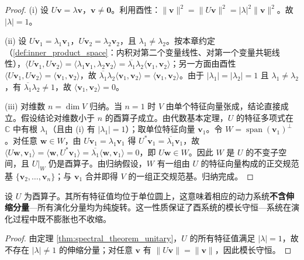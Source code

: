 \begin{proof}
(i) 设 $U\mathbf{v} = \lambda \mathbf{v}$，$\mathbf{v} \neq \mathbf{0}$。利用酉性：$\|\mathbf{v}\|^2 = \|U\mathbf{v}\|^2 = |\lambda|^2 \|\mathbf{v}\|^2$。故 $|\lambda| = 1$。

(ii) 设 $U\mathbf{v}_1 = \lambda_1 \mathbf{v}_1$，$U\mathbf{v}_2 = \lambda_2 \mathbf{v}_2$，且 $\lambda_1 \neq \lambda_2$。按本章约定（\cref{def:inner_product_space}：内积对第二个变量线性、对第一个变量共轭线性），$\langle U\mathbf{v}_1, U\mathbf{v}_2 \rangle = \langle \lambda_1 \mathbf{v}_1, \lambda_2 \mathbf{v}_2 \rangle = \overline{\lambda_1} \lambda_2 \langle \mathbf{v}_1, \mathbf{v}_2 \rangle$；另一方面由酉性 $\langle U\mathbf{v}_1, U\mathbf{v}_2 \rangle = \langle \mathbf{v}_1, \mathbf{v}_2 \rangle$，故 $\overline{\lambda_1} \lambda_2 \langle \mathbf{v}_1, \mathbf{v}_2 \rangle = \langle \mathbf{v}_1, \mathbf{v}_2 \rangle$。由于 $|\lambda_1| = |\lambda_2| = 1$ 且 $\lambda_1 \neq \lambda_2$，有 $\overline{\lambda_1} \lambda_2 \neq 1$，故 $\langle \mathbf{v}_1, \mathbf{v}_2 \rangle = 0$。

(iii) 对维数 $n = \dim V$ 归纳。当 $n=1$ 时 $V$ 由单个特征向量张成，结论直接成立。假设结论对维数小于 $n$ 的酉算子成立。由代数基本定理，$U$ 的特征多项式在 $\mathbb{C}$ 中有根 $\lambda_1$（且由 (i) 有 $|\lambda_1| = 1$）；取单位特征向量 $\mathbf{v}_1$。令 $W = \operatorname{span}(\mathbf{v}_1)^\perp$。对任意 $\mathbf{w} \in W$，由 $U\mathbf{v}_1 = \lambda_1\mathbf{v}_1$ 得 $U^*\mathbf{v}_1 = \overline{\lambda_1}\mathbf{v}_1$，故 $\langle U\mathbf{w}, \mathbf{v}_1 \rangle = \langle \mathbf{w}, U^*\mathbf{v}_1 \rangle = \overline{\lambda_1}\langle \mathbf{w}, \mathbf{v}_1 \rangle = 0$，即 $U\mathbf{w} \in W$。因此 $W$ 是 $U$ 的不变子空间，且 $U|_W$ 仍是酉算子。由归纳假设，$W$ 有一组由 $U$ 的特征向量构成的正交规范基 $\{\mathbf{v}_2, \dots, \mathbf{v}_n\}$；与 $\mathbf{v}_1$ 合并即得 $V$ 的一组正交规范基。归纳完成。
\end{proof}

\begin{corollary}[酉谱定理与旋度守恒律]\label{cor:unitary_conservation}
设 $U$ 为酉算子。其所有特征值均位于单位圆上，这意味着相应的动力系统\textbf{不含伸缩分量}---所有演化分量均为纯旋转。这一性质保证了酉系统的模长守恒---系统在演化过程中既不膨胀也不收缩。
\end{corollary}

\begin{proof}
由定理 \ref{thm:spectral_theorem_unitary}，$U$ 的所有特征值满足 $|\lambda| = 1$，故不存在 $|\lambda| \neq 1$ 的伸缩分量；对任意 $\mathbf{v}$ 有 $\|U\mathbf{v}\| = \|\mathbf{v}\|$，因此模长守恒。
\end{proof}

